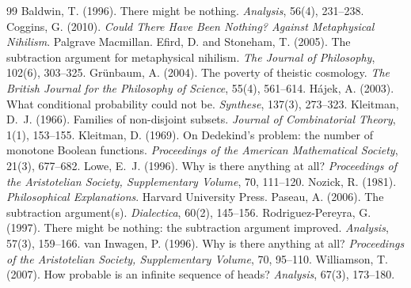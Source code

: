 \documentclass{situationist-preprint}
\begin{document}
\begin{thebibliography}{99}\small
{} Baldwin, T. (1996). There might be nothing. \emph{Analysis}, 56(4), 231--238.
 Coggins, G. (2010). \emph{Could There Have Been Nothing? Against Metaphysical Nihilism}. Palgrave Macmillan.
 Efird, D. and Stoneham, T. (2005). The subtraction argument for metaphysical nihilism. \emph{The Journal of Philosophy}, 102(6), 303--325.
 Grünbaum, A. (2004). The poverty of theistic cosmology. \emph{The British Journal for the Philosophy of Science}, 55(4), 561--614.
 Hájek, A. (2003). What conditional probability could not be. \emph{Synthese}, 137(3), 273--323.
 Kleitman, D.~J. (1966). Families of non-disjoint subsets. \emph{Journal of Combinatorial Theory}, 1(1), 153--155.
 Kleitman, D. (1969). On Dedekind's problem: the number of monotone Boolean functions. \emph{Proceedings of the American Mathematical Society}, 21(3), 677--682.
 Lowe, E.~J. (1996). Why is there anything at all? \emph{Proceedings of the Aristotelian Society, Supplementary Volume}, 70, 111--120.
 Nozick, R. (1981). \emph{Philosophical Explanations}. Harvard University Press.
 Paseau, A. (2006). The subtraction argument(s). \emph{Dialectica}, 60(2), 145--156.
 Rodriguez-Pereyra, G. (1997). There might be nothing: the subtraction argument improved. \emph{Analysis}, 57(3), 159--166.
 van Inwagen, P. (1996). Why is there anything at all? \emph{Proceedings of the Aristotelian Society, Supplementary Volume}, 70, 95--110.
 Williamson, T. (2007). How probable is an infinite sequence of heads? \emph{Analysis}, 67(3), 173--180.
\end{thebibliography}
\end{document}
